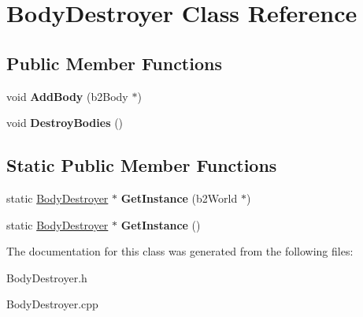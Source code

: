 \hypertarget{class_body_destroyer}{}\section{Body\+Destroyer Class Reference}
\label{class_body_destroyer}
\subsection*{Public Member Functions}
\begin{DoxyCompactItemize}
\item 
void {\bfseries Add\+Body} (b2\+Body $\ast$)\hypertarget{class_body_destroyer_abbc682b9137e715797e9f27cb756f29c}{}\label{class_body_destroyer_abbc682b9137e715797e9f27cb756f29c}

\item 
void {\bfseries Destroy\+Bodies} ()\hypertarget{class_body_destroyer_a6eaecb575946221de96c79f53b287e4f}{}\label{class_body_destroyer_a6eaecb575946221de96c79f53b287e4f}

\end{DoxyCompactItemize}
\subsection*{Static Public Member Functions}
\begin{DoxyCompactItemize}
\item 
static \hyperlink{class_body_destroyer}{Body\+Destroyer} $\ast$ {\bfseries Get\+Instance} (b2\+World $\ast$)\hypertarget{class_body_destroyer_ab15637390b87af60544a2b86d1ac82c9}{}\label{class_body_destroyer_ab15637390b87af60544a2b86d1ac82c9}

\item 
static \hyperlink{class_body_destroyer}{Body\+Destroyer} $\ast$ {\bfseries Get\+Instance} ()\hypertarget{class_body_destroyer_a694163f38bb51d819b8acb9eab49f856}{}\label{class_body_destroyer_a694163f38bb51d819b8acb9eab49f856}

\end{DoxyCompactItemize}


The documentation for this class was generated from the following files\+:\begin{DoxyCompactItemize}
\item 
Body\+Destroyer.\+h\item 
Body\+Destroyer.\+cpp\end{DoxyCompactItemize}
